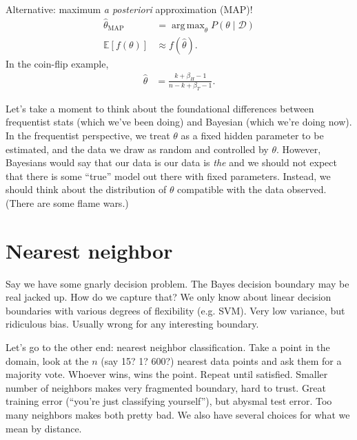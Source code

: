 \documentclass[11pt,letterpaper]{article}
\DeclareMathOperator*{\argmax}{arg\,max}
\theoremstyle{definition}
\numberwithin{equation}{section}
\numberwithin{figure}{section}
\begin{document}
Alternative: maximum \emph{a posteriori} approximation (MAP)!
%
\begin{align}
	\hat{\theta}_{\mathrm{MAP}} &= \argmax_\theta P(\theta \mid \mathcal{D})\\
	\mathbb{E}[f(\theta)] &\approx f(\hat{\theta}).
\end{align}
%
In the coin-flip example,
%
\begin{align}
	\hat{\theta} &= \frac{k + \beta_H - 1}{n - k + \beta_T - 1}.
\end{align}




Let's take a moment to think about the foundational differences between frequentist stats (which we've been doing) and Bayesian (which we're doing now). In the frequentist perspective, we treat $\theta$ as a fixed hidden parameter to be estimated, and the data we draw as random and controlled by $\theta$. However, Bayesians would say that our data is our data is \emph{the} and we should not expect that there is some ``true'' model out there with fixed parameters. Instead, we should think about the distribution of $\theta$ compatible with the data observed. (There are some flame wars.)
























\section{Nearest neighbor}
Say we have some gnarly decision problem. The Bayes decision boundary may be real jacked up. How do we capture that? We only know about linear decision boundaries with various degrees of flexibility (e.g. SVM). Very low variance, but ridiculous bias. Usually wrong for any interesting boundary.

Let's go to the other end: nearest neighbor classification. Take a point in the domain, look at the $n$ (say 15? 1? 600?) nearest data points and ask them for a majority vote. Whoever wins, wins the point. Repeat until satisfied. Smaller number of neighbors makes very fragmented boundary, hard to trust. Great training error (``you're just classifying yourself''), but abysmal test error. Too many neighbors makes both pretty bad. We also have several choices for what we mean by distance.
\end{document}
